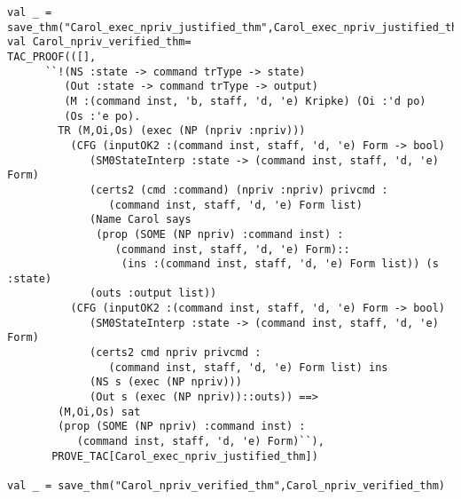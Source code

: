 \documentclass{report}
\begin{document}
\begin{lstlisting}[frame=TBlr]
val _ = save_thm("Carol_exec_npriv_justified_thm",Carol_exec_npriv_justified_thm)
val Carol_npriv_verified_thm=
TAC_PROOF(([],
      ``!(NS :state -> command trType -> state)
         (Out :state -> command trType -> output)
         (M :(command inst, 'b, staff, 'd, 'e) Kripke) (Oi :'d po)
         (Os :'e po).
        TR (M,Oi,Os) (exec (NP (npriv :npriv)))
          (CFG (inputOK2 :(command inst, staff, 'd, 'e) Form -> bool)
             (SM0StateInterp :state -> (command inst, staff, 'd, 'e) Form)
             (certs2 (cmd :command) (npriv :npriv) privcmd :
                (command inst, staff, 'd, 'e) Form list)
             (Name Carol says
              (prop (SOME (NP npriv) :command inst) :
                 (command inst, staff, 'd, 'e) Form)::
                  (ins :(command inst, staff, 'd, 'e) Form list)) (s :state)
             (outs :output list))
          (CFG (inputOK2 :(command inst, staff, 'd, 'e) Form -> bool)
             (SM0StateInterp :state -> (command inst, staff, 'd, 'e) Form)
             (certs2 cmd npriv privcmd :
                (command inst, staff, 'd, 'e) Form list) ins
             (NS s (exec (NP npriv)))
             (Out s (exec (NP npriv))::outs)) ==>
        (M,Oi,Os) sat
        (prop (SOME (NP npriv) :command inst) :
           (command inst, staff, 'd, 'e) Form)``),
	   PROVE_TAC[Carol_exec_npriv_justified_thm])

val _ = save_thm("Carol_npriv_verified_thm",Carol_npriv_verified_thm)


\end{lstlisting}
\end{document}
